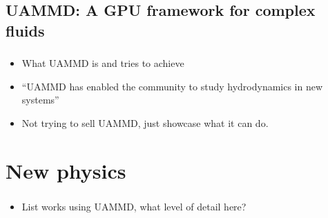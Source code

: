 \documentclass{beamer}
\begin{document}
\subsection{UAMMD: A GPU framework for complex fluids}
\begin{frame}
  \frametitle{\insertsubsectionnavigation{\linewidth}} 
  \begin{itemize}
  \item What UAMMD is and tries to achieve
  \item ``UAMMD has enabled the community to study hydrodynamics in new systems''
  \item Not trying to sell UAMMD, just showcase what it can do.    
  \end{itemize}
\end{frame}

\section{New physics}

\begin{frame}
  \frametitle{\insertsectionnavigation{\linewidth}} 
  \begin{itemize}
  \item List works using UAMMD, what level of detail here?
  \end{itemize}
\end{frame}
\end{document}

